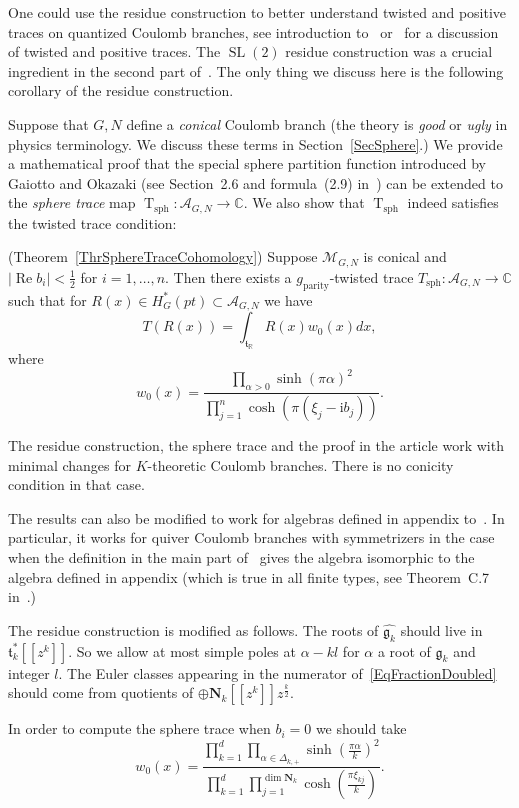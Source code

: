 \documentclass{article}
\newcommand{\R}{\mathbb{R}}
\renewcommand{\C}{\mathbb{C}}
\newcommand{\SL}{\mathop{\mathrm{SL}}\nolimits}
\newcommand{\mf}{\mathfrak}
\newcommand{\mc}[1]{\mathcal{#1}}
\renewcommand{\Re}{\operatorname{Re}}
\newcommand{\abs}[1]{\lvert #1\rvert}
\newcommand{\rmi}{\mathrm{i}}
\DeclareMathOperator{\sph}{sph}
\DeclareMathOperator{\T}{T}
\begin{document}
One could use the residue construction to better understand twisted and positive traces on quantized Coulomb branches, see introduction to~\cite{KAb} or~\cite{KV} for a discussion of twisted and positive traces. The $\SL(2)$ residue construction was a crucial ingredient in the second part of~\cite{KV}. The only thing we discuss here is the following corollary of the residue construction.

Suppose that $G,N$ define a {\it conical} Coulomb branch (the theory is {\it good} or {\it ugly} in physics terminology. We discuss these terms in Section~\ref{SecSphere}.) We provide a mathematical proof that the special sphere partition function introduced by Gaiotto and Okazaki (see Section~2.6 and formula~(2.9) in~\cite{GO}) can be extended to the  {\it sphere trace} map $\T_{\sph}\colon \mc{A}_{G,N}\to \C.$ We also show that $\T_{\sph}$ indeed satisfies the twisted trace condition:
\begin{thr*}(Theorem~\ref{ThrSphereTraceCohomology})
Suppose $\mc{M}_{G,N}$ is conical and $\abs{\Re b_i}<\tfrac12$ for $i=1,\ldots,n$. Then there exists a $g_{\text{parity}}$-twisted trace $T_{\sph}\colon \mc{A}_{G,N}\to \C$ such that for $R(x)\in H^*_G(pt)\subset \mc{A}_{G,N}$ we have
\[T(R(x))=\int_{\mf{t}_{\R}}R(x)w_0(x)dx,\] where \[w_0(x)=\frac{\prod_{\alpha>0} \sinh(\pi\alpha)^2}{\prod_{j=1}^n \cosh(\pi(\xi_j-\rmi b_j))}.\]
\end{thr*}
\begin{rem}
The residue construction, the sphere trace and the proof in the article work with minimal changes for $K$-theoretic Coulomb branches. There is no conicity condition in that case.

The results can also be modified to work for algebras defined in appendix to~\cite{NW}. In particular, it works for quiver Coulomb branches with symmetrizers in the case when the definition in the main part of~\cite{NW} gives the algebra isomorphic to the algebra defined in appendix (which is true in all finite types, see Theorem~C.7 in~\cite{NW}.)



The residue construction is modified as follows. The roots of $\hat{\mf{g}_k}$ should live in $\mf{t}_k^*[[z^k]]$. So we allow at most simple poles at $\alpha-kl$ for $\alpha$ a root of $\mf{g}_k$ and integer $l$. The Euler classes appearing in the numerator of~\eqref{EqFractionDoubled} should come from quotients of $\oplus \mathbf{N}_k[[z^k]]z^{\tfrac k2}$.

In order to compute the sphere trace when $b_i=0$ we should take \[w_0(x)=\frac{\prod_{k=1}^d\prod_{\alpha\in\Delta_{k,+}}\sinh(\frac{\pi\alpha}{k})^2}{\prod_{k=1}^d\prod_{j=1}^{\dim \mathbf{N}_k}\cosh(\frac{\pi\xi_{kj}}{k})}.\]


\end{rem}
\end{document}
